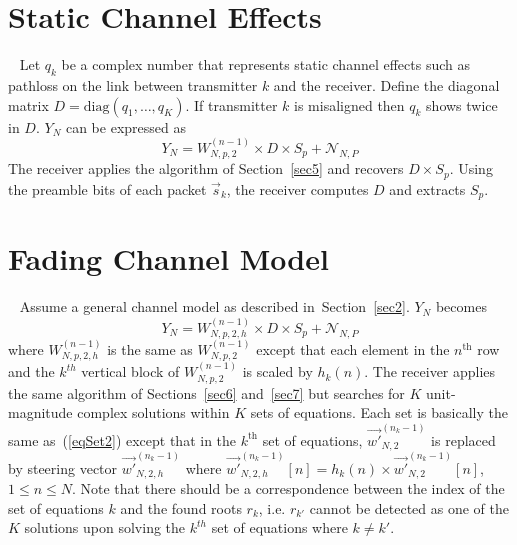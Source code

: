 \documentclass[10pt, a4paper, twocolumn]{IEEEtran}
\begin{document}
\section{Static Channel Effects}~\label{sec6}
Let $q_k$ be a complex number that represents static channel effects such as pathloss on the link between transmitter $k$ and the receiver. Define the diagonal matrix $D = \text{diag}(q_1,\dots,q_K)$. If transmitter $k$ is misaligned then $q_k$ shows twice in $D$. $Y_N$ can be expressed as
\begin{equation}
Y_N = W_{N,p,2}^{(n-1)}\times D\times S_p + \mathcal{N}_{N,P}
\end{equation}
\noindent The receiver applies the algorithm of Section~\ref{sec5} and recovers $D\times S_p$. Using the preamble bits of each packet $\overrightarrow{s}_k$, the receiver computes $D$ and extracts $S_p$.

\section{Fading Channel Model}~\label{sec7}
Assume a general channel model as described in~Section~\ref{sec2}. $Y_N$ becomes
\begin{equation}
Y_N = W_{N,p,2,h}^{(n-1)}\times D\times S_p + \mathcal{N}_{N,P}
\end{equation}
\noindent where $W_{N,p,2,h}^{(n-1)}$ is the same as $W_{N,p,2}^{(n-1)}$ except that each element in the $n^{\text{th}}$ row and the $k^{th}$ vertical block of $W_{N,p,2}^{(n-1)}$ is scaled by $h_k(n)$. The receiver applies the same algorithm of Sections~\ref{sec6} and~\ref{sec7} but searches for $K$ unit-magnitude complex solutions within $K$ sets of equations. Each set is basically the same as~(\ref{eqSet2}) except that in the $k^{\text{th}}$ set of equations, $\overrightarrow{w'}_{N,2}^{(n_k-1)}$ is replaced by steering vector $\overrightarrow{w'}_{N,2,h}^{(n_k-1)}$ where $\overrightarrow{w'}_{N,2,h}^{(n_k-1)}[n] = h_k(n)\times  \overrightarrow{w'}_{N,2}^{(n_k-1)}[n]$, $1\leq n\leq N$. Note that there should be a correspondence between the index of the set of equations $k$ and the found roots $r_k$, i.e. $r_{k'}$ cannot be detected as one of the $K$ solutions upon solving the $k^{th}$ set of equations where $k\neq k'$. 
\end{document}
